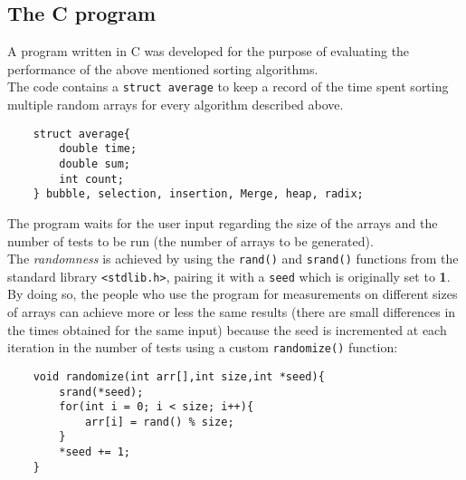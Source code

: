 \documentclass{article}
\begin{document}
\subsection{The C program}

A program written in C was developed for the purpose of evaluating the performance of the above mentioned sorting algorithms.\\
The code contains a \texttt{struct average} to keep a record of the time spent sorting multiple random arrays for every algorithm described above.
\begin{verbatim}
    struct average{
        double time;
        double sum;
        int count;
    } bubble, selection, insertion, Merge, heap, radix;
\end{verbatim}

The program waits for the user input regarding the size of the arrays and the number of tests to be run (the number of arrays to be generated).\\
The \emph{randomness} is achieved by using the \texttt{rand()} and \texttt{srand()} functions from the standard library \texttt{<stdlib.h>}, pairing it with a \texttt{seed} which is originally set to \textbf{1}. \\
By doing so, the people who use the program for measurements on different sizes of arrays can achieve more or less the same results (there are small differences in the times obtained for the same input) because the seed is incremented at each iteration in the number of tests using a custom \texttt{randomize()} function:

\begin{verbatim}
    void randomize(int arr[],int size,int *seed){
        srand(*seed);
        for(int i = 0; i < size; i++){
            arr[i] = rand() % size;
        }
        *seed += 1;
    }
\end{verbatim}

\clearpage
\end{document}
